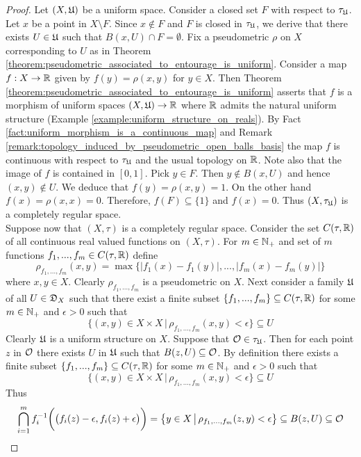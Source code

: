 \begin{proof}
Let $(X,{\mathfrak U})$ be a uniform space. Consider a closed set $F$ with respect to $\tau_{{\mathfrak U}}$. Let $x$ be a point in $X\setminus F$. Since $x \not \in F$ and $F$ is closed in $\tau_{{\mathfrak U}}$, we derive that there exists $U \in {\mathfrak U}$ such that $B(x,U)\cap F = \emptyset$. Fix a pseudometric $\rho$ on $X$ corresponding to $U$ as in Theorem \ref{theorem:pseudometric_associated_to_entourage_is_uniform}. Consider a map $f:X\rightarrow {\mathbb R}$ given by $f(y) = \rho(x,y)$ for $y\in X$. Then Theorem \ref{theorem:pseudometric_associated_to_entourage_is_uniform} asserts that $f$ is a morphism of uniform spaces $\left(X,{\mathfrak U}\right)\rightarrow {\mathbb R}$ where ${\mathbb R}$ admits the natural uniform structure (Example \ref{example:uniform_structure_on_reals}). By Fact \ref{fact:uniform_morphism_is_a_continuous_map} and Remark \ref{remark:topology_induced_by_pseudometric_open_balls_basis} the map $f$ is continuous with respect to $\tau_{{\mathfrak U}}$ and the usual topology on ${\mathbb R}$. Note also that the image of $f$ is contained in $[0,1]$. Pick $y\in F$. Then $y \not \in B(x,U)$ and hence $(x,y) \not \in U$. We deduce that $f(y) = \rho(x,y) = 1$. On the other hand $f(x) = \rho(x,x) = 0$. Therefore, $f(F) \subseteq \{1\}$ and $f(x) = 0$. Thus $(X,\tau_{{\mathfrak U}})$ is a completely regular space.\\
Suppose now that $(X,\tau)$ is a completely regular space. Consider the set $C(\tau,{\mathbb R})$ of all continuous real valued functions on $(X,\tau)$. For $m\in {\mathbb N}_+$ and set of $m$ functions $f_1,...,f_m\in C(\tau,{\mathbb R})$ define
$$\rho_{f_1,...,f_m}(x,y) = \max \big\{|f_1(x) - f_1(y)|,...,|f_m(x) - f_m(y)|\big\}$$
where $x,y\in X$. Clearly $\rho_{f_1,...,f_m}$ is a pseudometric on $X$. Next consider a family ${\mathfrak U}$ of all $U\in {\mathfrak D}_X$ such that there exist a finite subset $\{f_1,...,f_m\}\subseteq C(\tau,{\mathbb R})$ for some $m \in {\mathbb N}_+$ and $\epsilon > 0$ such that
$$\big\{(x,y)\in X\times X\,\big|\,\rho_{f_1,...,f_m}(x,y) < \epsilon\big\}\subseteq U$$
Clearly ${\mathfrak U}$ is a uniform structure on $X$. Suppose that ${\mathcal O} \in \tau_{{\mathfrak U}}$. Then for each point $z$ in ${\mathcal O}$ there exists $U$ in ${\mathfrak U}$ such that $B(z,U)\subseteq {\mathcal O}$. By definition there exists a finite subset $\{f_1,...,f_m\}\subseteq C(\tau,{\mathbb R})$ for some $m \in {\mathbb N}_+$ and $\epsilon > 0$ such that
$$\big\{(x,y)\in X\times X\,\big|\,\rho_{f_1,...,f_m}(x,y) < \epsilon\big\}\subseteq U$$
Thus
$$\bigcap_{i=1}^mf_i^{-1}\bigg(\big(f_i(z) - \epsilon, f_i(z) + \epsilon\big)\bigg) = \big\{y\in X \,\big|\, \rho_{f_1,...,f_m}(z,y) < \epsilon\big\} \subseteq B(z,U)\subseteq {\mathcal O}$$

\end{proof}
